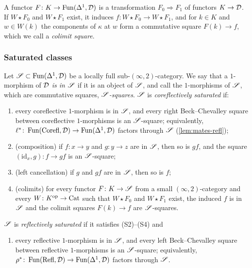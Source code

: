 %
A functor
$F\colon K \to \operatorname{Fun}(\Delta^{1},\mathcal{D})$
is a transformation
$F_{0} \Rightarrow F_{1}$
of functors $K \to \mathcal{D}$. If $W \star F_{0}$ and $W \star F_{1}$ exist, it induces
$f\colon W \star F_{0} \to W \star F_{1}$,
and for $k \in K$ and $w \in W(k)$ the components of $\kappa$ at $w$ form a
commutative square $F(k) \to f$, which we call a \emph{colimit square}.

\subsubsection*{Saturated classes}

\begin{defi}
\label{def:saturated}
%
Let
$\mathscr{S} \subset \operatorname{Fun}(\Delta^{1},\mathcal{D})$
be a locally full sub-$(\infty,2)$-category.
We say that a $1$-morphism of $\mathcal{D}$ \emph{is in $\mathscr{S}$} if it is an object of
$\mathscr{S}$, and call the $1$-morphisms of $\mathscr{S}$, which are commutative squares,
\emph{$\mathscr{S}$-squares}. $\mathscr{S}$ is \emph{coreflectively saturated} if:
\begin{enumerate}
\item[(S1)] every coreflective $1$-morphism is in $\mathscr{S}$,
and every right Beck--Chevalley square between coreflective $1$-morphisms is an
$\mathscr{S}$-square; equivalently,
$\ell^{*}\colon \operatorname{Fun}(\mathrm{Corefl},\mathcal{D}) \to \operatorname{Fun}(\Delta^{1},\mathcal{D})$
factors through $\mathscr{S}$ (\cref{lem:mates-refl});
\item[(S2)] (composition) if $f\colon x \to y$ and $g\colon y \to z$ are in
$\mathscr{S}$, then so is $gf$, and the square
$(\mathrm{id}_{x},g)\colon f \to gf$
is an $\mathscr{S}$-square;
\item[(S3)] (left cancellation) if $g$ and $gf$ are in $\mathscr{S}$, then so is $f$;
\item[(S4)] (colimits) for every functor $F\colon K \to \mathscr{S}$ from a small
$(\infty,2)$-category and every
$W\colon K^{\mathrm{op}} \to \mathrm{Cat}$
such that $W \star F_{0}$ and $W \star F_{1}$ exist,
the induced $f$ is in $\mathscr{S}$ and the colimit squares $F(k) \to f$ are
$\mathscr{S}$-squares.
\end{enumerate}
$\mathscr{S}$ is \emph{reflectively saturated} if it satisfies (S2)--(S4) and
\begin{enumerate}
\item[(S1')] every reflective $1$-morphism is in $\mathscr{S}$,
and every left Beck--Chevalley square between reflective $1$-morphisms is an
$\mathscr{S}$-square; equivalently,
$\rho^{*}\colon \operatorname{Fun}(\mathrm{Refl},\mathcal{D}) \to \operatorname{Fun}(\Delta^{1},\mathcal{D})$
factors through $\mathscr{S}$.
\end{enumerate}
\end{defi}

